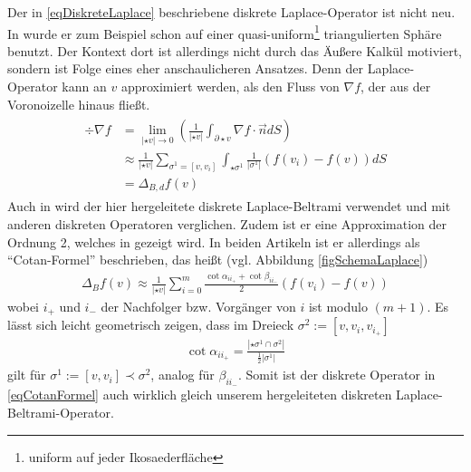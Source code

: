     \begin{bemerkung}
      Der in \eqref{eqDiskreteLaplace} beschriebene diskrete Laplace-Operator ist nicht neu.
      In \cite{arakawa} wurde er zum Beispiel schon auf einer quasi-uniform\footnote{uniform auf jeder Ikosaederfläche} 
      triangulierten Sphäre benutzt.
      Der Kontext dort ist allerdings nicht durch das Äußere Kalkül motiviert, sondern ist Folge eines eher anschaulicheren Ansatzes.
      Denn der Laplace-Operator kann an \( v \) approximiert werden, als den Fluss von \( \nabla f \), der aus der Voronoizelle hinaus fließt.
      \begin{align}
      \begin{aligned}
        \div\nabla f&= \lim_{\left| \star v \right| \rightarrow 0}
                                 \left( \frac{1}{\left| \star v \right|} \int_{\partial\star v}
                                              \nabla f \cdot \vec{n} dS\right) \\
                     &\approx \frac{1}{\left| \star v \right|} \sum_{\sigma^{1}=\left[ v,v_{i} \right]}
                                  \int_{\star\sigma^{1}} \frac{1}{\left| \sigma^{1} \right|} \left( f(v_{i}) - f(v) \right) dS \\
                     &= \Delta_{B,d} f(v)             
      \end{aligned}
      \end{align}
      Auch in \cite{meyer} wird der hier hergeleitete diskrete Laplace-Beltrami verwendet und mit anderen diskreten Operatoren verglichen.
      Zudem ist er eine Approximation der Ordnung 2, welches in \cite{xu} gezeigt wird.
      In beiden Artikeln ist er allerdings als "`Cotan-Formel"' beschrieben, das heißt (vgl. Abbildung \ref{figSchemaLaplace})
      \begin{align}
        \label{eqCotanFormel}
        \Delta_{B} f(v) \approx \frac{1}{\left| \star v \right|} \sum_{i=0}^{m} 
                      \frac{\cot\alpha_{ii_{+}} + \cot\beta_{ii_{-}}}{2}
                            \left( f(v_{i}) - f(v) \right)
      \end{align}
      wobei \( i_{+} \) und \( i_{-} \) der Nachfolger bzw. Vorgänger von \( i \) ist modulo \( (m+1) \).
      Es lässt sich leicht geometrisch zeigen, dass im Dreieck \( \sigma^{2}:=\left[ v, v_{i}, v_{i_{+}} \right] \) 
      \begin{align}
        \cot\alpha_{ii_{+}} = \frac{\left| \star\sigma^{1} \cap \sigma^{2} \right|}{\frac{1}{2}\left| \sigma^{1} \right|}
      \end{align}
      gilt für \( \sigma^{1}:=\left[ v, v_{i} \right] \prec \sigma^{2}\),
      analog für \( \beta_{ii_{-}} \).
      Somit ist der diskrete Operator in \eqref{eqCotanFormel} auch wirklich gleich unserem hergeleiteten diskreten Laplace-Beltrami-Operator.


\end{bemerkung}

